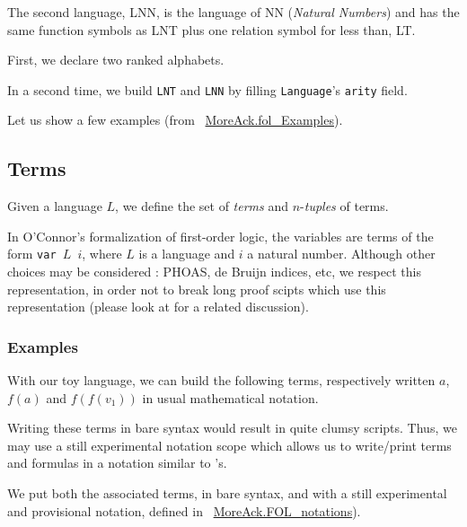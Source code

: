 The second language, LNN, is the language of NN (\emph{Natural Numbers}) and has
the same function symbols as LNT plus one relation symbol for less than, LT.

First, we declare two ranked alphabets. 

In a second time, we build \texttt{LNT} and \texttt{LNN} by filling \texttt{Language}'s \texttt{arity} field.



Let us show a few examples (from ~\href{../theories/html/hydras.MoreAck.fol_Examples.html}{MoreAck.fol\_Examples}).



\subsection{Terms}

Given a language $L$, we define the set of \emph{terms} and
$n$-\emph{tuples} of terms. 





\begin{remark}[Variables]
In O'Connor's formalization of first-order logic, the variables are \gallina terms of the form \texttt{var $L$ $i$}, where $L$ is
 a language and $i$ a natural number. 
Although other choices may be considered : PHOAS, de Bruijn indices, etc,  we   respect this representation, in order not to break long proof scipts which use this representation (please look at \cite{OConnor05} for a related discussion).
  
\end{remark}
\subsubsection{Examples}

With our toy language, we can build the following terms, respectively written $a$, $f(a)$ and $f(f(v_1))$ in usual mathematical notation. 

Writing these terms in bare \gallina syntax would result in quite clumsy scripts. Thus, we may use a still experimental notation scope which allows us to write/print terms and formulas in a 
notation similar to \coq's.





We put both the associated \coq{} terms, in bare \gallina{} syntax, and with a still experimental and provisional notation, defined in
~\href{../theories/html/hydras.MoreAck.FOL_notations.html}{MoreAck.FOL\_notations}).




